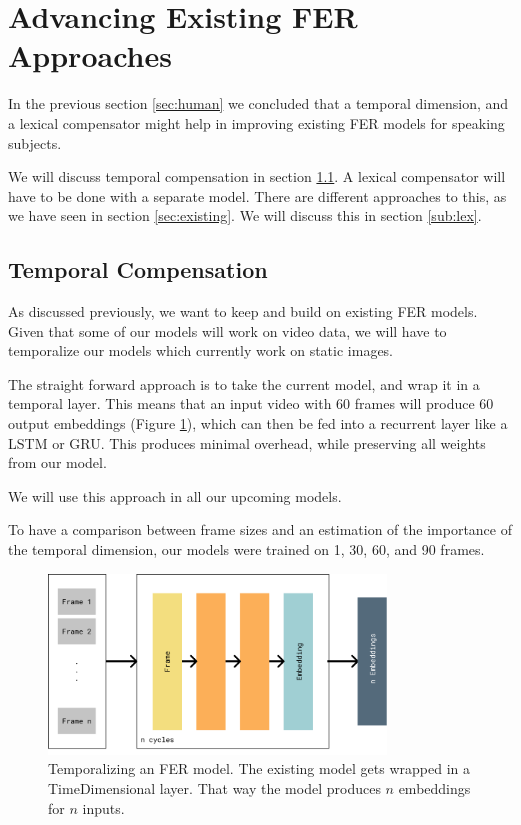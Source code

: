 \newpage
\section{Advancing Existing FER Approaches}
\label{sec:models}

In the previous section \ref{sec:human} we concluded that a temporal dimension, and a lexical compensator might help in improving existing FER models for speaking subjects. 

We will discuss temporal compensation in section \ref{sub:temp}. A lexical compensator will have to be done with a separate model. There are different approaches to this, as we have seen in section \ref{sec:existing}. We will discuss this in section \ref{sub:lex}.

\subsection{Temporal Compensation}
\label{sub:temp}
As discussed previously, we want to keep and build on existing FER models. Given that some of our models will work on video data, we will have to temporalize our models which currently work on static images.

The straight forward approach is to take the current model, and wrap it in a temporal layer. This means that an input video with 60 frames will produce 60 output embeddings (Figure \ref{fig:temporalization}), which can then be fed into a recurrent layer like a LSTM or GRU. This produces minimal overhead, while preserving all weights from our model.

We will use this approach in all our upcoming models.

To have a comparison between frame sizes and an estimation of the importance of the temporal dimension, our models were trained on 1, 30, 60, and 90 frames.

\begin{figure}
    \centering
    \includegraphics[width=0.8\textwidth]{res/png_backup/temporalisation.png}
    \caption{Temporalizing an FER model. The existing model gets wrapped in a TimeDimensional layer. That way the model produces $n$ embeddings for $n$ inputs.}
    \label{fig:temporalization}
\end{figure}

